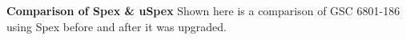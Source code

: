 {\bf Comparison of Spex \& uSpex} Shown here is a comparison of GSC 6801-186 using Spex before and after it was upgraded. \label{fig:uSpex-Spex}